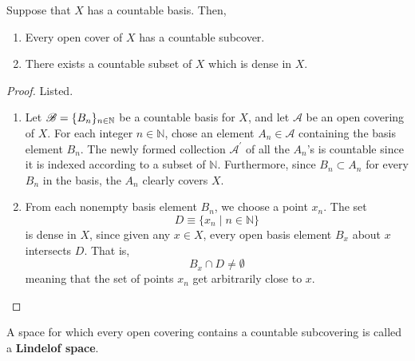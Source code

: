     \begin{theorem}
      Suppose that $X$ has a countable basis. Then, 
      \begin{enumerate}
        \item Every open cover of $X$ has a countable subcover. 
        \item There exists a countable subset of $X$ which is dense in $X$. 
      \end{enumerate}
    \end{theorem}
    \begin{proof}
      Listed. 
      \begin{enumerate}
        \item Let $\B = \{B_n\}_{n \in \mathbb{N}}$ be a countable basis for $X$, and let $\mathscr{A}$ be an open covering of $X$. For each integer $n \in \mathbb{N}$, chose an element $A_n \in \mathscr{A}$ containing the basis element $B_n$. The newly formed collection $\mathscr{A}^\prime$ of all the $A_n$'s is countable since it is indexed according to a subset of $\mathbb{N}$. Furthermore, since $B_n \subset A_n$ for every $B_n$ in the basis, the $A_n$ clearly covers $X$. 

        \item From each nonempty basis element $B_n$, we choose a point $x_n$. The set 
        \begin{equation}
          D \equiv \{x_n \; | \; n \in \mathbb{N}\}
        \end{equation}
        is dense in $X$, since given any $x \in X$, every open basis element $B_x$ about $x$ intersects $D$. That is, 
        \begin{equation}
          B_x \cap D \neq \emptyset
        \end{equation}
        meaning that the set of points $x_n$ get arbitrarily close to $x$. 
      \end{enumerate}
    \end{proof}

    \begin{definition}
      A space for which every open covering contains a countable subcovering is called a \textbf{Lindelof space}. 
    \end{definition}

